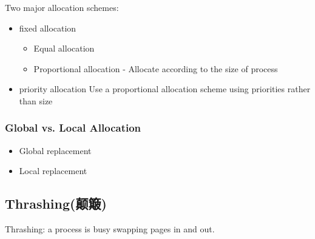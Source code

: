 Two major allocation schemes:
\begin{itemize}
    \item fixed allocation
    \begin{itemize}\scriptsize
        \item Equal allocation
        \item Proportional allocation - Allocate according to the size of process
    \end{itemize}
    \item priority allocation
    \subitem Use a proportional allocation scheme using priorities rather than size
\end{itemize}

\subsubsection{Global vs. Local Allocation}
\begin{itemize}%
    \item Global replacement
    \item Local replacement
\end{itemize}

\subsection{Thrashing(颠簸)}
Thrashing: a process is busy swapping pages in and out. 




